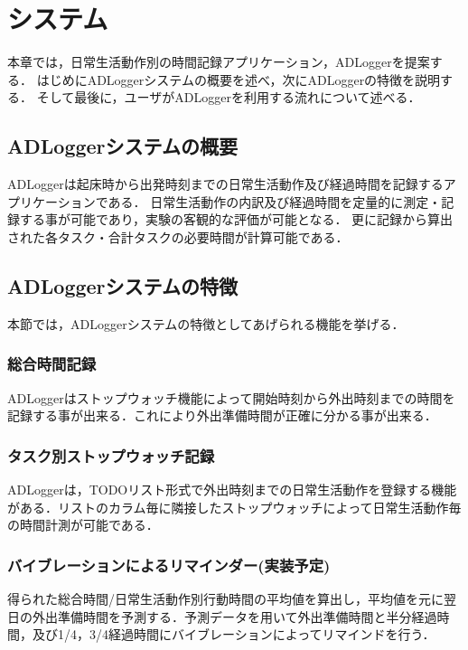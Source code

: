 \chapter{システム}
本章では，日常生活動作別の時間記録アプリケーション，ADLoggerを提案する．
はじめにADLoggerシステムの概要を述べ，次にADLoggerの特徴を説明する．
そして最後に，ユーザがADLoggerを利用する流れについて述べる．

\section{ADLoggerシステムの概要}
ADLoggerは起床時から出発時刻までの日常生活動作及び経過時間を記録するアプリケーションである．
日常生活動作の内訳及び経過時間を定量的に測定・記録する事が可能であり，実験の客観的な評価が可能となる．
更に記録から算出された各タスク・合計タスクの必要時間が計算可能である．

\section{ADLoggerシステムの特徴}
本節では，ADLoggerシステムの特徴としてあげられる機能を挙げる．

\subsection{総合時間記録}
ADLoggerはストップウォッチ機能によって開始時刻から外出時刻までの時間を記録する事が出来る．これにより外出準備時間が正確に分かる事が出来る．
\subsection{タスク別ストップウォッチ記録}
ADLoggerは，TODOリスト形式で外出時刻までの日常生活動作を登録する機能がある．リストのカラム毎に隣接したストップウォッチによって日常生活動作毎の時間計測が可能である．
\subsection{バイブレーションによるリマインダー(実装予定)}
得られた総合時間/日常生活動作別行動時間の平均値を算出し，平均値を元に翌日の外出準備時間を予測する．予測データを用いて外出準備時間と半分経過時間，及び1/4，3/4経過時間にバイブレーションによってリマインドを行う．


